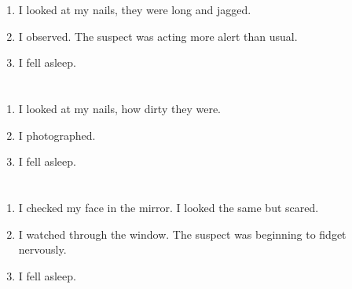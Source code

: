 \documentclass{article}
\begin{document}
    \newpage
    
    \section{}
    
    \begin{enumerate}
    
    \item I looked at my nails, they were long and jagged.\\
    
    \item I observed. The suspect was acting more alert than usual.\\
    
    \item I fell asleep.\\
    
    \end{enumerate}
     
    \newpage
    
    \section{}
    
    \begin{enumerate}
    
    \item I looked at my nails, how dirty they were.\\
    
    \item I photographed.\\
    
    \item I fell asleep.\\
    
    \end{enumerate}
     
    \newpage
    
    \section{}
    
    \begin{enumerate}
    
    \item I checked my face in the mirror. I looked the same but scared.\\
    
    \item I watched through the window. The suspect was beginning to fidget nervously.\\
    
    \item I fell asleep.\\
    
    \end{enumerate}
     
\end{document}
